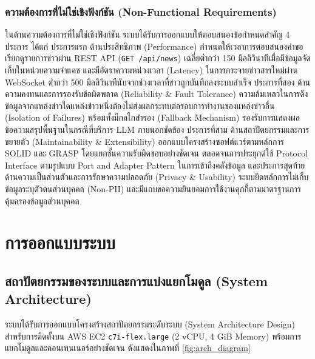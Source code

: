 \subsubsection{ความต้องการที่ไม่ใช่เชิงฟังก์ชัน (Non-Functional Requirements)}

ในด้านความต้องการที่ไม่ใช่เชิงฟังก์ชัน ระบบได้รับการออกแบบให้ตอบสนองข้อกำหนดสำคัญ 4 ประการ ได้แก่ ประการแรก ด้านประสิทธิภาพ (Performance) กำหนดให้เวลาการตอบสนองคำขอเรียกดูรายการข่าวผ่าน REST API (\texttt{GET /api/news}) เฉลี่ยต่ำกว่า 150 มิลลิวินาทีเมื่อมีข้อมูลจัดเก็บในหน่วยความจำแคช และมีอัตราความหน่วงเวลา (Latency) ในการกระจายข่าวสารใหม่ผ่าน WebSocket ต่ำกว่า 500 มิลลิวินาทีนับจากช่วงเวลาที่ข่าวถูกบันทึกลงระบบสำเร็จ ประการที่สอง ด้านความคงทนและการรองรับข้อผิดพลาด (Reliability \& Fault Tolerance) ความล้มเหลวในการดึงข้อมูลจากแหล่งข่าวใดแหล่งข่าวหนึ่งต้องไม่ส่งผลกระทบต่อรอบการทำงานของแหล่งข่าวอื่น (Isolation of Failures) พร้อมทั้งมีกลไกสำรอง (Fallback Mechanism) รองรับการแสดงผลข้อความสรุปพื้นฐานในกรณีที่บริการ LLM ภายนอกขัดข้อง ประการที่สาม ด้านสถาปัตยกรรมและการขยายตัว (Maintainability \& Extensibility) ออกแบบโครงสร้างซอฟต์แวร์ตามหลักการ SOLID และ GRASP โดยแยกชั้นความรับผิดชอบอย่างชัดเจน ตลอดจนการประยุกต์ใช้ Protocol Interface ตามรูปแบบ Port and Adapter Pattern ในการเข้าถึงคลังข้อมูล และประการสุดท้าย ด้านความเป็นส่วนตัวและการรักษาความปลอดภัย (Privacy \& Usability) ระบบยึดหลักการไม่เก็บข้อมูลระบุตัวตนส่วนบุคคล (Non-PII) และมีแถบขอความยินยอมการใช้งานคุกกี้ตามมาตรฐานการคุ้มครองข้อมูลส่วนบุคคล


\section{การออกแบบระบบ}

\subsection{สถาปัตยกรรมของระบบและการแบ่งแยกโมดูล (System Architecture)}

ระบบได้รับการออกแบบโครงสร้างสถาปัตยกรรมระดับระบบ (System Architecture Design) สำหรับการติดตั้งบน AWS EC2 \texttt{c7i-flex.large} (2 vCPU, 4 GiB Memory) พร้อมการแยกโมดูลและคอนเทนเนอร์อย่างชัดเจน ดังแสดงในภาพที่ \ref{fig:arch_diagram}

